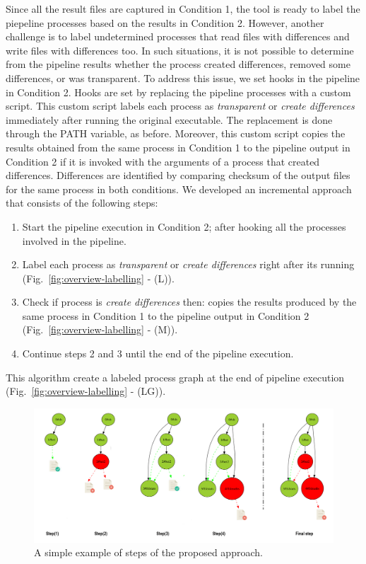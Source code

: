 \documentclass[a4paper,num-refs]{oup-contemporary}
\begin{document}
Since all the result files are captured in Condition 1, the tool 
is ready to label the piepeline processes based on the results in Condition 2.
However, another challenge is to label undetermined processes that read files with 
differences and write files with differences too. In such 
situations, it is not possible to determine from the pipeline results 
whether the process created differences, removed some differences, or 
was transparent.
To address this issue, we set hooks in the pipeline 
in Condition 2. Hooks are set by replacing the pipeline 
processes with a custom script. This custom script labels each process 
as \emph{transparent} or \emph{create differences} immediately after running 
the original executable. 
The replacement is done through the PATH variable, as before. Moreover, 
this custom script copies the results obtained from the same process in 
Condition 1 to the pipeline output in Condition 2 if 
it is invoked with 
the arguments of a process that created differences. 
Differences are identified by comparing checksum of the output files for 
the same process in both conditions.
We developed an incremental approach that consists of the following steps: 

\begin{enumerate}
  \item Start the pipeline execution in Condition 2; 
        after hooking all the processes involved in the pipeline.
  \item Label each process as \emph{transparent} or \emph{create differences} 
        right after its running (Fig.~\ref{fig:overview-labelling} - (L)).
  \item Check if process is \emph{create differences} then: 
        copies the results produced by the same process in Condition 1 to the 
        pipeline output in Condition 2 (Fig.~\ref{fig:overview-labelling} - (M)). 
  \item Continue steps 2 and 3 until the end of the pipeline execution.
\end{enumerate}

This algorithm create a labeled process graph at the end of pipeline execution 
(Fig.~\ref{fig:overview-labelling} - (LG)).

\begin{figure}
  \centering
  \includegraphics[width=\columnwidth]{images/iterative_modif}
  \caption{A simple example of steps of the proposed approach.}
  \label{fig:iterations}
\end{figure}
\end{document}
